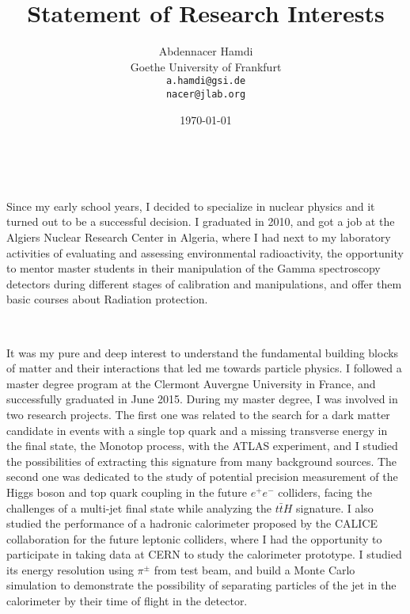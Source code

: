 \documentclass[a4paper]{article}
\title{Statement of Research Interests} %
\author{Abdennacer Hamdi\\
Goethe University of Frankfurt\\
\texttt{a.hamdi@gsi.de}\\
\texttt{nacer@jlab.org}}
\date{\today}
\begin{document}
\fontsize{12}{15}
\selectfont
\maketitle


~\par Since my early school years, I decided to specialize in nuclear physics and it turned out to be a successful decision. I graduated in 2010, and got a job at the Algiers Nuclear Research Center in Algeria, where I had next to my laboratory activities of evaluating and assessing environmental radioactivity, the opportunity to mentor master students in their manipulation of the Gamma spectroscopy detectors during different stages of calibration and manipulations, and offer them basic courses about Radiation protection.

~\par It was my pure and deep interest to understand the fundamental building blocks of matter and their interactions that led me towards particle physics. I followed a master degree program at the Clermont Auvergne University in France, and successfully graduated in June 2015. During my master degree, I was involved in two research projects. The first one was related to the search for a dark matter candidate in events with a single top quark and a missing transverse energy in the final state, the Monotop process, with the ATLAS experiment, and I studied the possibilities of extracting this signature from many background sources. The second one was dedicated to  the study of potential precision measurement of the Higgs boson and top quark coupling in the future $e^+e^-$ colliders, facing the challenges of a multi-jet final state while analyzing the $t\bar{t}H$ signature. I also studied the performance of a hadronic calorimeter proposed by the CALICE collaboration for the future leptonic colliders, where I had the opportunity to participate in taking data at CERN to study the calorimeter prototype. I studied its energy resolution using $\pi^{\pm}$ from test beam, and build a Monte Carlo simulation to demonstrate the possibility of separating particles of the jet in the calorimeter by their time of flight in the detector.
\end{document}
